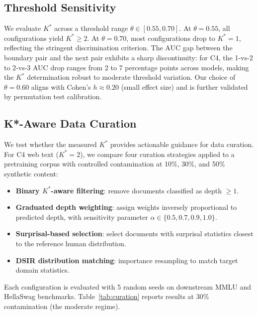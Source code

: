 \documentclass[11pt,a4paper]{article}
\newcommand{\Kstar}{K^{*}}
\begin{document}
\subsection{Threshold Sensitivity}

We evaluate $\Kstar$ across a threshold range $\theta \in [0.55, 0.70]$. At $\theta = 0.55$, all configurations yield $\Kstar \geq 2$. At $\theta = 0.70$, most configurations drop to $\Kstar = 1$, reflecting the stringent discrimination criterion. The AUC gap between the boundary pair and the next pair exhibits a sharp discontinuity: for C4, the 1-vs-2 to 2-vs-3 AUC drop ranges from 2 to 7 percentage points across models, making the $\Kstar$ determination robust to moderate threshold variation. Our choice of $\theta = 0.60$ aligns with Cohen's $h \approx 0.20$ (small effect size) and is further validated by permutation test calibration.

\subsection{K*-Aware Data Curation}
\label{sec:curation}

We test whether the measured $\Kstar$ provides actionable guidance for data curation. For C4 web text ($\Kstar = 2$), we compare four curation strategies applied to a pretraining corpus with controlled contamination at 10\%, 30\%, and 50\% synthetic content:

\begin{itemize}
\item \textbf{Binary $\Kstar$-aware filtering}: remove documents classified as depth $\geq 1$.
\item \textbf{Graduated depth weighting}: assign weights inversely proportional to predicted depth, with sensitivity parameter $\alpha \in \{0.5, 0.7, 0.9, 1.0\}$.
\item \textbf{Surprisal-based selection}: select documents with surprisal statistics closest to the reference human distribution.
\item \textbf{DSIR distribution matching}: importance resampling to match target domain statistics.
\end{itemize}

Each configuration is evaluated with 5 random seeds on downstream MMLU and HellaSwag benchmarks. Table~\ref{tab:curation} reports results at 30\% contamination (the moderate regime).
\end{document}
